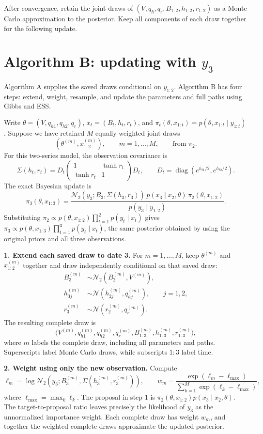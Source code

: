 \documentclass[10pt,a4paper]{article}
\newcommand{\N}{\mathcal N}
\newcommand{\diag}{\operatorname{diag}}
\begin{document}
After convergence, retain the joint draws of
$(V,q_h,q_r,B_{1:2},h_{1:2},r_{1:2})$ as a Monte Carlo approximation to the
posterior. Keep all components of each draw together for the following update.

\clearpage
\section*{Algorithm B: updating with $y_3$}

Algorithm A supplies the saved draws conditional on $y_{1:2}$. Algorithm B has four steps: extend, weight, resample, and update the parameters and full paths using Gibbs and ESS.

Write $\theta=(V,q_{h1},q_{h2},q_r)$, $x_t=(B_t,h_t,r_t)$, and
$\pi_t(\theta,x_{1:t})=p(\theta,x_{1:t}\mid y_{1:t})$.
Suppose we have retained $M$ equally weighted joint draws
\[
  (\theta^{(m)},x_{1:2}^{(m)}),\qquad m=1,\ldots,M,
  \qquad\text{from }\pi_2.
\]
For this two-series model, the observation covariance is
\[
\Sigma(h_t,r_t)=D_t
\begin{pmatrix}1&\tanh r_t\\ \tanh r_t&1\end{pmatrix}D_t,
\qquad D_t=\diag(e^{h_{t1}/2},e^{h_{t2}/2}).
\]
The exact Bayesian update is
\[
\boxed{
\pi_3(\theta,x_{1:3})=
\frac{\N_2(y_3;B_3,\Sigma(h_3,r_3))\,
      p(x_3\mid x_2,\theta)\,\pi_2(\theta,x_{1:2})}
     {p(y_3\mid y_{1:2})}.}
\]
Substituting $\pi_2\propto p(\theta,x_{1:2})\prod_{t=1}^2p(y_t\mid x_t)$
gives $\pi_3\propto p(\theta,x_{1:3})\prod_{t=1}^3p(y_t\mid x_t)$,
the same posterior obtained by using the original priors and all three observations.

\textbf{1. Extend each saved draw to date 3.}
For $m=1,\ldots,M$, keep $\theta^{(m)}$ and $x_{1:2}^{(m)}$ together and draw
independently conditional on that saved draw:
\begin{align*}
B_3^{(m)}&\sim\N_2(B_2^{(m)},V^{(m)}),\\
h_{3j}^{(m)}&\sim\N(h_{2j}^{(m)},q_{hj}^{(m)}),\qquad j=1,2,\\
r_3^{(m)}&\sim\N(r_2^{(m)},q_r^{(m)}).
\end{align*}
The resulting complete draw is
\[
\bigl(V^{(m)},q_{h1}^{(m)},q_{h2}^{(m)},q_r^{(m)},
B_{1:3}^{(m)},h_{1:3}^{(m)},r_{1:3}^{(m)}\bigr),
\]
where $m$ labels the complete draw, including all parameters and paths.
Superscripts label Monte Carlo draws, while subscripts $1:3$ label time.

\textbf{2. Weight using only the new observation.}
Compute
\[
\ell_m=\log\N_2\!\left(y_3;B_3^{(m)},
                    \Sigma(h_3^{(m)},r_3^{(m)})\right),
\qquad
w_m=\frac{\exp(\ell_m-\ell_{\max})}
           {\sum_{k=1}^M\exp(\ell_k-\ell_{\max})},
\]
where $\ell_{\max}=\max_k\ell_k$. The proposal in step 1 is
$\pi_2(\theta,x_{1:2})p(x_3\mid x_2,\theta)$. The target-to-proposal ratio
leaves precisely the likelihood of $y_3$ as the unnormalized importance weight.
Each complete draw has weight $w_m$, and together the weighted complete draws
approximate the updated posterior.
\end{document}
